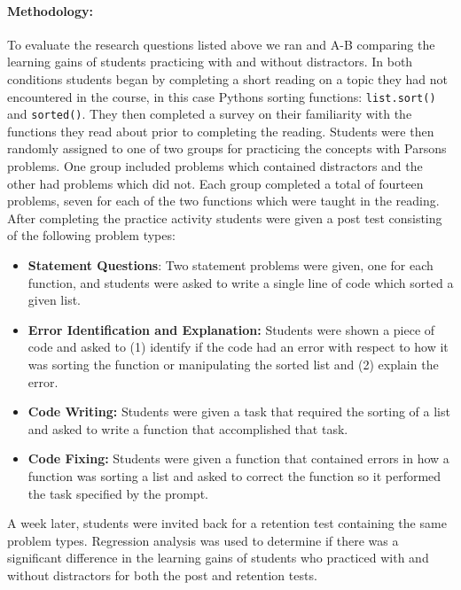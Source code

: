 \documentclass[authorversion,nonacm]{acmart}
\begin{document}
\paragraph{Methodology:} 

To evaluate the research questions listed above we ran and A-B comparing the
learning gains of students practicing with and without distractors.  In both
conditions students began by completing a short reading on a topic they had not
encountered in the course, in this case Pythons sorting functions:
\texttt{list.sort()} and \texttt{sorted()}.  They then completed a survey on
their familiarity with the functions they read about prior to completing the
reading.  Students were then randomly assigned to one of two groups for
practicing the concepts with Parsons problems. One group included problems
which contained distractors and the other had problems which did not.  Each
group completed a total of fourteen problems, seven for each of the two
functions which were taught in the reading. After completing the practice
activity students were given a post test consisting of the following problem
types:
\begin{itemize}
  \item \textbf{Statement Questions}: Two statement problems were given, one for each function, and students were asked to write a single line of code which sorted a given list.
  \item \textbf{Error Identification and Explanation:} Students were shown a piece of code and asked to (1) identify if the code had an error with respect to how it was sorting the function or manipulating the sorted list and (2) explain the error.
  \item \textbf{Code Writing:} Students were given a task that required the sorting of a list and asked to write a function that accomplished that task.
  \item \textbf{Code Fixing:} Students were given a function that contained errors in how a function was sorting a list and asked to correct the function so it performed the task specified by the prompt.
\end{itemize}
A week later, students were invited back for a retention test containing the
same problem types. Regression analysis was used to determine if there was a
significant difference in the learning gains of students who practiced with and
without distractors for both the post and retention tests.
\end{document}
